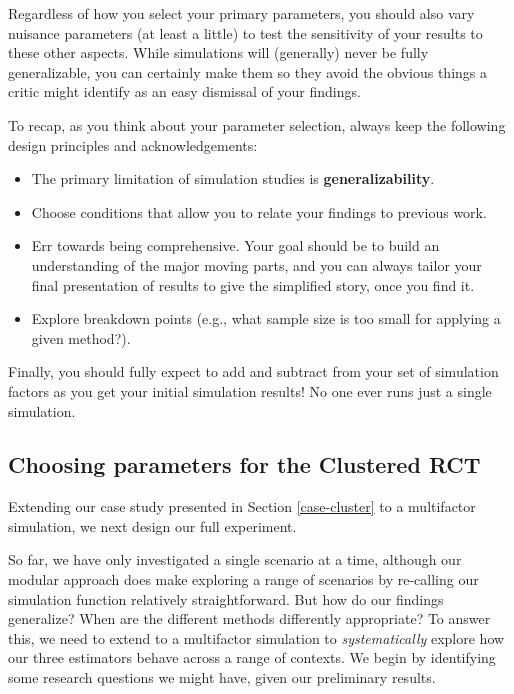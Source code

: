 \documentclass[
]{book}
\providecommand{\tightlist}{%
  \setlength{\itemsep}{0pt}\setlength{\parskip}{0pt}}
\begin{document}
Regardless of how you select your primary parameters, you should also vary nuisance parameters (at least a little) to test the sensitivity of your results to these other aspects.
While simulations will (generally) never be fully generalizable, you can certainly make them so they avoid the obvious things a critic might identify as an easy dismissal of your findings.

To recap, as you think about your parameter selection, always keep the following design principles and acknowledgements:

\begin{itemize}
\tightlist
\item
  The primary limitation of simulation studies is \textbf{generalizability}.
\item
  Choose conditions that allow you to relate your findings to previous work.
\item
  Err towards being comprehensive. Your goal should be to build an understanding of the major moving parts, and you can always tailor your final presentation of results to give the simplified story, once you find it.
\item
  Explore breakdown points (e.g., what sample size is too small for applying a given method?).
\end{itemize}

Finally, you should fully expect to add and subtract from your set of simulation factors as you get your initial simulation results! No one ever runs just a single simulation.

\subsection{Choosing parameters for the Clustered RCT}\label{choosing-parameters-for-the-clustered-rct}

Extending our case study presented in Section \ref{case-cluster} to a multifactor simulation, we next design our full experiment.

So far, we have only investigated a single scenario at a time, although our modular approach does make exploring a range of scenarios by re-calling our simulation function relatively straightforward.
But how do our findings generalize? When are the different methods differently appropriate?
To answer this, we need to extend to a multifactor simulation to \emph{systematically} explore how our three estimators behave across a range of contexts.
We begin by identifying some research questions we might have, given our preliminary results.
\end{document}
